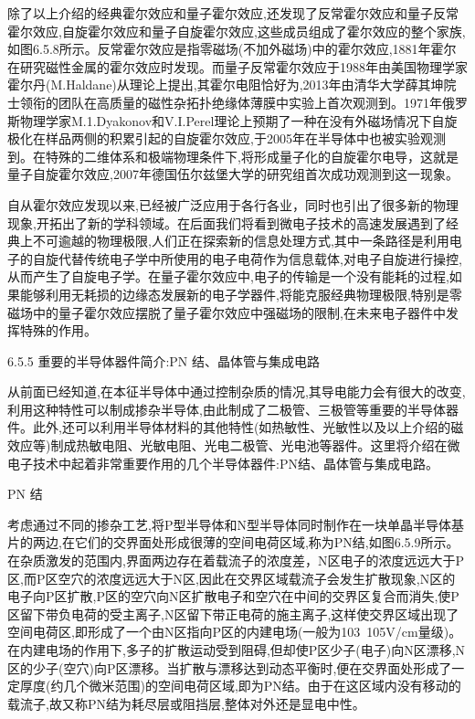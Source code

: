 除了以上介绍的经典霍尔效应和量子霍尔效应,还发现了反常霍尔效应和量子反常霍尔效应,自旋霍尔效应和量子自旋霍尔效应,这些成员组成了霍尔效应的整个家族,如图6.5.8所示。反常霍尔效应是指零磁场(不加外磁场)中的霍尔效应,1881年霍尔在研究磁性金属的霍尔效应时发现。而量子反常霍尔效应于1988年由美国物理学家霍尔丹(M.Haldane)从理论上提出,其霍尔电阻恰好为,2013年由清华大学薛其坤院士领衔的团队在高质量的磁性杂拓扑绝缘体薄膜中实验上首次观测到。1971年俄罗斯物理学家M.1.Dyakonov和V.I.Perel理论上预期了一种在没有外磁场情况下自旋极化在样品两侧的积累引起的自旋霍尔效应,于2005年在半导体中也被实验观测到。在特殊的二维体系和极端物理条件下,将形成量子化的自旋霍尔电导，这就是量子自旋霍尔效应,2007年德国伍尔兹堡大学的研究组首次成功观测到这一现象。

自从霍尔效应发现以来,已经被广泛应用于各行各业，同时也引出了很多新的物理现象,开拓出了新的学科领域。在后面我们将看到微电子技术的高速发展遇到了经典上不可逾越的物理极限,人们正在探索新的信息处理方式,其中一条路径是利用电子的自旋代替传统电子学中所使用的电子电荷作为信息载体,对电子自旋进行操控,从而产生了自旋电子学。在量子霍尔效应中,电子的传输是一个没有能耗的过程,如果能够利用无耗损的边缘态发展新的电子学器件,将能克服经典物理极限,特别是零磁场中的量子霍尔效应摆脱了量子霍尔效应中强磁场的限制,在未来电子器件中发挥特殊的作用。



6.5.5 重要的半导体器件简介:PN 结、晶体管与集成电路

从前面已经知道,在本征半导体中通过控制杂质的情况,其导电能力会有很大的改变,利用这种特性可以制成掺杂半导体,由此制成了二极管、三极管等重要的半导体器件。此外,还可以利用半导体材料的其他特性(如热敏性、光敏性以及以上介绍的磁效应等)制成热敏电阻、光敏电阻、光电二极管、光电池等器件。这里将介绍在微电子技术中起着非常重要作用的几个半导体器件:PN结、晶体管与集成电路。

PN 结

考虑通过不同的掺杂工艺,将P型半导体和N型半导体同时制作在一块单晶半导体基片的两边,在它们的交界面处形成很薄的空间电荷区域,称为PN结,如图6.5.9所示。在杂质激发的范围内,界面两边存在着载流子的浓度差，N区电子的浓度远远大于P区,而P区空穴的浓度远远大于N区,因此在交界区域载流子会发生扩散现象,N区的电子向P区扩散,P区的空穴向N区扩散电子和空穴在中间的交界区复合而消失,使P区留下带负电荷的受主离子,N区留下带正电荷的施主离子,这样使交界区域出现了空间电荷区,即形成了一个由N区指向P区的内建电场(一般为103~105V/cm量级)。在内建电场的作用下,多子的扩散运动受到阻碍,但却使P区少子(电子)向N区漂移,N区的少子(空穴)向P区漂移。当扩散与漂移达到动态平衡时,便在交界面处形成了一定厚度(约几个微米范围)的空间电荷区域,即为PN结。由于在这区域内没有移动的载流子,故又称PN结为耗尽层或阻挡层,整体对外还是显电中性。



